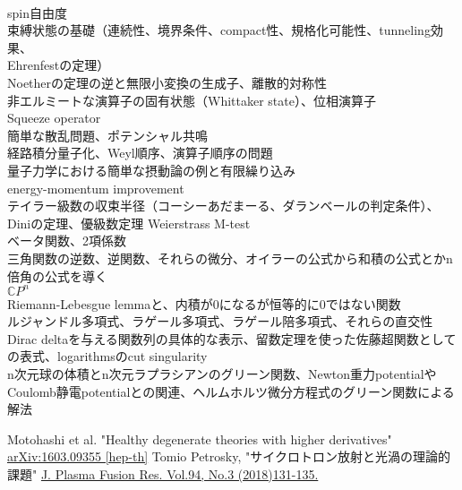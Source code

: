\documentclass[dvipdfmx, uplatex]{jsarticle}
\begin{document}
\\spin自由度
\\束縛状態の基礎（連続性、境界条件、compact性、規格化可能性、tunneling効果、
\\Ehrenfestの定理）
\\Noetherの定理の逆と無限小変換の生成子、離散的対称性
\\非エルミートな演算子の固有状態（Whittaker state）、位相演算子
\\Squeeze operator
\\簡単な散乱問題、ポテンシャル共鳴
\\経路積分量子化、Weyl順序、演算子順序の問題
\\量子力学における簡単な摂動論の例と有限繰り込み
\\energy-momentum improvement
\\テイラー級数の収束半径（コーシーあだまーる、ダランベールの判定条件）、Diniの定理、優級数定理 Weierstrass M-test
\\ベータ関数、2項係数
\\三角関数の逆数、逆関数、それらの微分、オイラーの公式から和積の公式とかn倍角の公式を導く
\\$\mathbb{C}P^n$
\\Riemann-Lebesgue lemmaと、内積が0になるが恒等的に0ではない関数
\\ルジャンドル多項式、ラゲール多項式、ラゲール陪多項式、それらの直交性
\\Dirac deltaを与える関数列の具体的な表示、留数定理を使った佐藤超関数としての表式、logarithmsのcut singularity
\\n次元球の体積とn次元ラプラシアンのグリーン関数、Newton重力potentialやCoulomb静電potentialとの関連、ヘルムホルツ微分方程式のグリーン関数による解法

\newpage


\newpage


\newpage


\newpage


\newpage
{}

\begin{thebibliography}{99}
  Motohashi et al.
  "Healthy degenerate theories with higher derivatives"
  \href{https://arxiv.org/abs/1603.09355}{	arXiv:1603.09355 [hep-th]}
  Tomio Petrosky,
  "サイクロトロン放射と光渦の理論的課題"
  \href{http://www.jspf.or.jp/Journal/PDF_JSPF/jspf2018_03/jspf2018_03-131.pdf}
  {J. Plasma Fusion Res. Vol.94, No.3 (2018)131-135.}
\end{thebibliography}
\end{document}
